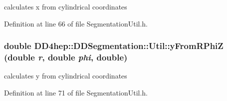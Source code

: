 calculates x from cylindrical coordinates 

Definition at line 66 of file SegmentationUtil.h.\hypertarget{namespace_d_d4hep_1_1_d_d_segmentation_1_1_util_a7c2700f5933a62c0f9f2977adfbf6deb}{
\subsubsection[{yFromRPhiZ}]{\setlength{\rightskip}{0pt plus 5cm}double DD4hep::DDSegmentation::Util::yFromRPhiZ (double {\em r}, \/  double {\em phi}, \/  double)}}
\label{namespace_d_d4hep_1_1_d_d_segmentation_1_1_util_a7c2700f5933a62c0f9f2977adfbf6deb}


calculates y from cylindrical coordinates 

Definition at line 71 of file SegmentationUtil.h.